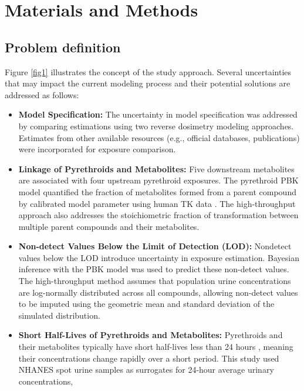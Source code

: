 \documentclass[toxics,article,submit,pdftex,moreauthors]{Definitions/mdpi}
\begin{document}

\section{Materials and Methods}\label{materials-and-methods}

\subsection{Problem definition}\label{problem-definition}

Figure \ref{fig1} illustrates the concept of the study approach. Several
uncertainties that may impact the current modeling process and their potential solutions
are addressed as follows:

\begin{itemize}
\item
  \textbf{Model Specification:} The uncertainty in model specification
  was addressed by comparing estimations using two reverse dosimetry
  modeling approaches. Estimates from other available resources (e.g.,
  official databases, publications) were incorporated for exposure
  comparison.
\item
  \textbf{Linkage of Pyrethroids and Metabolites:} Five downstream
  metabolites are associated with four upstream pyrethroid exposures.
  The pyrethroid PBK model quantified the fraction of metabolites formed
  from a parent compound by calibrated model parameter using human TK
  data \citep{quindroit2019estimating}. The high-throughput approach
  also addresses the stoichiometric fraction of transformation between
  multiple parent compounds and their metabolites.
\item
  \textbf{Non-detect Values Below the Limit of Detection (LOD):}
  Nondetect values below the LOD introduce uncertainty in exposure
  estimation. Bayesian inference with the PBK model was used to predict
  these non-detect values. The high-throughput method assumes that
  population urine concentrations are log-normally distributed across
  all compounds, allowing non-detect values to be imputed using the
  geometric mean and standard deviation of the simulated distribution.
\item
  \textbf{Short Half-Lives of Pyrethroids and Metabolites:} Pyrethroids
  and their metabolites typically have short half-lives less than 24
  hours \citep{hays2007biomonitoring}, meaning their concentrations
  change rapidly over a short period. This study used NHANES spot urine
  samples as surrogates for 24-hour average urinary concentrations,

\end{itemize}
\end{document}
